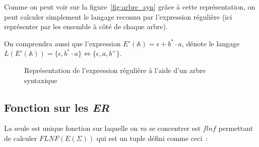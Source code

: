 \documentclass[12pt]{article}
\begin{document}
Comme on peut voir sur la figure~\ref{fig:arbre_syn} grâce à cette
représentation, on peut calculer simplement le langage reconnu par l'expression
régulière (ici représenter par les ensemble à côté de chaque arbre).

\vphantom{}

On comprendra aussi que l'expression \(E'(\mathbb{A}) = \epsilon + b^* \cdot
a\), dénote le langage \(L(E'(\mathbb{A})) = \{\epsilon, b^* \cdot a\}
\Leftrightarrow \{\epsilon, a, b^+\}\).

\begin{figure}[H]
    \centering
    \caption{
        Représentation de l'expression régulière à l'aide d'un arbre syntaxique
    }
\end{figure}

\subsection{Fonction sur les \textit{ER}}

La seule est unique fonction sur laquelle on va se concentrer est \(flnf\)
permettant de calculer \(FLNF(E(\Sigma))\) qui est un tuple défini comme ceci~:

\vphantom{}
\end{document}
